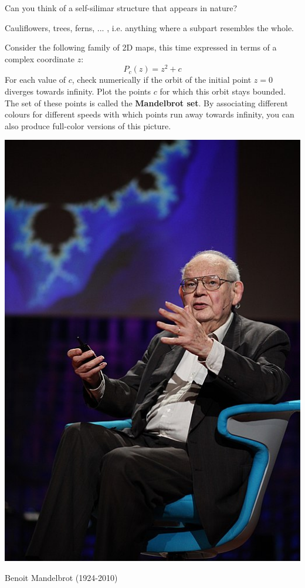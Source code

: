 \begin{exer}
Can you think of a self-silimar structure that appears in nature?
\begin{sol}
Cauliflowers, trees, ferns, ... , i.e. anything where a subpart resembles the whole.
\end{sol}
\end{exer}

\pagebreak

\begin{exer}
Consider the following family of 2D maps, this time expressed in terms of a complex coordinate $z$:
$$P_c(z)=z^2+c$$
For each value of $c$, check numerically if the orbit of the initial point $z=0$ diverges towards infinity. Plot the points $c$ for which this orbit stays bounded. The set of these points is called the \textbf{Mandelbrot set}. By associating different colours for different speeds with which points run away towards infinity, you can also produce full-color versions of this picture.
\end{exer}

\begin{marginfigure}[2cm]
\includegraphics{dynamic/figures/b_mandelbrot}
\caption{Benoit Mandelbrot (1924-2010)}
\end{marginfigure}

